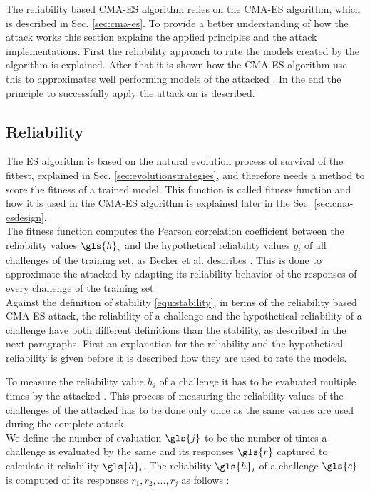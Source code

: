 The reliability based \ac{CMA-ES} algorithm relies on the \ac{CMA-ES} algorithm, which is described in Sec. \ref{sec:cma-es}.
To provide a better understanding of how the attack works this section explains the applied principles and the attack implementations.
First the reliability approach to rate the models created by the algorithm is explained.
After that it is shown how the \ac{CMA-ES} algorithm use this to approximates well performing models of the attacked \apuf.
In the end the principle to successfully apply the attack on \xpufs is described.


\subsection{Reliability}
\label{sec:reliability}

The \ac{ES} algorithm is based on the natural evolution process of survival of the fittest, explained in Sec. \ref{sec:evolutionstrategies}, and therefore needs a method to score the fitness of a trained model.
This function is called fitness function and how it is used in the \ac{CMA-ES} algorithm is explained later in the Sec. \ref{sec:cma-esdesign}.\\
The fitness function computes the Pearson correlation coefficient between the reliability values $\gls{h}_i$ and the hypothetical reliability values $g_i$ of all challenges of the training set, as Becker et al. describes \cite{Becker2015ThePUFs}.
This is done to approximate the attacked \puf by adapting its reliability behavior of the responses of every challenge of the training set.\\
Against the definition of stability \ref{equ:stability}, in terms of the reliability based \ac{CMA-ES} attack, the reliability of a challenge and the hypothetical reliability of a challenge have both different definitions than the stability, as described in the next paragraphs. 
First an explanation for the reliability and the hypothetical reliability is given before it is described how they are used to rate the models.

To measure the reliability value $h_i$ of a challenge it has to be evaluated multiple times by the attacked \puf.
This process of measuring the reliability values of the challenges of the attacked \puf has to be done only once as the same values are used during the complete attack.\\
We define the number of evaluation $\gls{j}$ to be the number of times a challenge is evaluated by the same \puf and its responses $\gls{r}$ captured to calculate it reliability $\gls{h}_i$.
The reliability $\gls{h}_i$ of a challenge $\gls{c}$ is computed of its responses $r_1, r_2, ..., r_j$ as follows \cite{Becker2015ThePUFs}:

